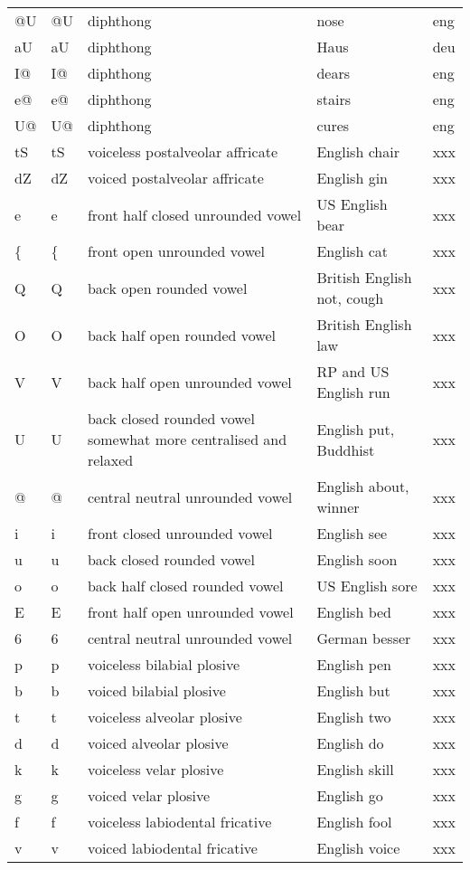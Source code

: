 \begin{longtable}{llp{}ll}
	@U & @U & diphthong & nose & eng\\
	aU & aU & diphthong & Haus & deu\\
	I@ & I@ & diphthong & dears & eng\\
	e@ & e@ & diphthong & stairs & eng\\
	U@ & U@ & diphthong & cures & eng\\
	tS & tS & voiceless postalveolar affricate & English chair & xxx\\
	dZ & dZ & voiced postalveolar affricate & English gin & xxx\\
	e & e & front half closed unrounded vowel & US English bear & xxx\\
	\{ & \{ & front open unrounded vowel & English cat & xxx\\
	Q & Q & back open rounded vowel & British English not, cough & xxx\\
	O & O & back half open rounded vowel & British English law & xxx\\
	V & V & back half open unrounded vowel & RP and US English run & xxx\\
	U & U & back closed rounded vowel somewhat more centralised and relaxed & English put, Buddhist & xxx\\
	@ & @ & central neutral unrounded vowel & English about, winner & xxx\\
	i & i & front closed unrounded vowel & English see & xxx\\
	u & u & back closed rounded vowel & English soon & xxx\\
	o & o & back half closed rounded vowel & US English sore & xxx\\
	E & E & front half open unrounded vowel & English bed & xxx\\
	6 & 6 & central neutral unrounded vowel & German besser & xxx\\
	p & p & voiceless bilabial plosive & English pen & xxx\\
	b & b & voiced bilabial plosive & English but & xxx\\
	t & t & voiceless alveolar plosive & English two & xxx\\
	d & d & voiced alveolar plosive & English do & xxx\\
	k & k & voiceless velar plosive & English skill & xxx\\
	g & g & voiced velar plosive & English go & xxx\\
	f & f & voiceless labiodental fricative & English fool & xxx\\
	v & v & voiced labiodental fricative & English voice & xxx\\

\end{longtable}

